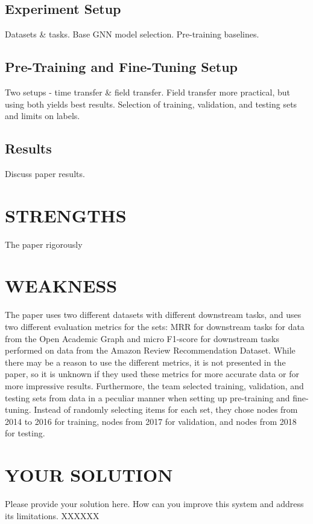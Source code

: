 \documentclass[sigconf,natbib=false]{acmart}
\begin{document}
	\subsection{Experiment Setup}
	Datasets \& tasks. Base GNN model selection. Pre-training baselines.
	\subsection{Pre-Training and Fine-Tuning Setup}
	Two setups - time transfer \& field transfer. Field transfer more practical,
	but using both yields best results. Selection of training, validation, and
	testing sets and limits on labels.
	\subsection{Results}
	Discuss paper results.

	\section{STRENGTHS}
The paper rigorously

	\section{WEAKNESS}
The paper uses two different datasets with different downstream tasks, and uses
two different evaluation metrics for the sets: MRR for downstream tasks for data
from the Open Academic Graph and micro F1-score for downstream tasks performed
on data from the Amazon Review Recommendation Dataset. While there may be a
reason to use the different metrics, it is not presented in the paper, so it is
unknown if they used these metrics for more accurate data or for more impressive
results. Furthermore, the team selected training, validation, and testing sets
from data in a peculiar manner when setting up pre-training and fine-tuning.
Instead of randomly selecting items for each set, they chose nodes from 2014 to
2016 for training, nodes from 2017 for validation, and nodes from 2018 for
testing.

	\section{YOUR SOLUTION}
	Please provide your solution here. How can you improve this system
and address its limitations. XXXXXX
\end{document}
